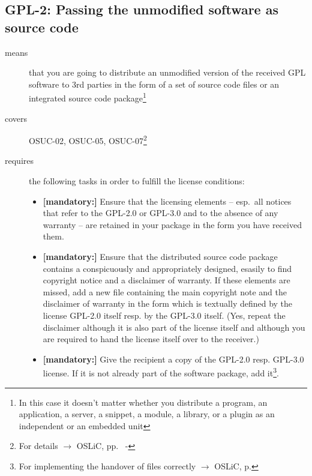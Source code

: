 \subsection{GPL-2: Passing the unmodified software as source code}
\label{OSUC-02-GPL} \label{OSUC-05-GPL} \label{OSUC-07-GPL} 

\begin{description}

\item[means] that you are going to distribute an unmodified version of the
received GPL software to 3rd parties in the form of a set of source code files
or an integrated source code package\footnote{In this case it doesn't matter
whether you  distribute a program, an application, a server, a snippet, a
module, a library, or a plugin as an independent or an embedded unit}

\item[covers] OSUC-02, OSUC-05, OSUC-07\footnote{For details $\rightarrow$
OSLiC, pp.\ \pageref{OSUC-02-DEF} - \pageref{OSUC-07-DEF}}

\item[requires] the following tasks in order to fulfill the license conditions:
\begin{itemize}
 
  \item \textbf{[mandatory:]} Ensure that the licensing elements -- esp.\ all
  notices that refer to the GPL-2.0 or GPL-3.0 and to the absence of any
  warranty -- are retained in your package in the form you have received them.

  \item \textbf{[mandatory:]} Ensure that the distributed source code package
  contains a conspicuously and appropriately designed, esasily to find copyright
  notice and a disclaimer of warranty. If these elements are missed, add a new
  file containing the main copyright note and the disclaimer of warranty in the
  form which is textually defined by the license GPL-2.0 itself resp. by the
  GPL-3.0 itself. (Yes, repeat the disclaimer although it is also part of the
  license itself and although you are required to hand the license itself over
  to the receiver.)
  
  \item \textbf{[mandatory:]} Give the recipient a copy of the GPL-2.0 resp.
  GPL-3.0 license. If it is not already part of the software package, add
  it\footnote{For implementing the handover of files correctly $\rightarrow$
  OSLiC, p. \pageref{DistributingFilesHint}}.
  

\end{itemize}
\end{description}
